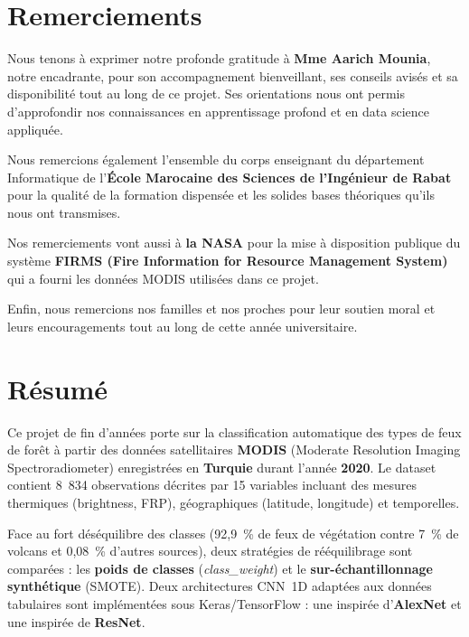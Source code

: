 \documentclass[12pt,a4paper]{report}
\begin{document}
\chapter*{Remerciements}
\thispagestyle{fancy}

\justifying
Nous tenons \`{a} exprimer notre profonde gratitude \`{a} \textbf{Mme Aarich Mounia}, notre encadrante, pour son accompagnement bienveillant, ses conseils avis\'{e}s et sa disponibilit\'{e} tout au long de ce projet. Ses orientations nous ont permis d'approfondir nos connaissances en apprentissage profond et en data science appliqu\'{e}e.

Nous remercions \'{e}galement l'ensemble du corps enseignant du d\'{e}partement Informatique de l'\textbf{\'{E}cole Marocaine des Sciences de l'Ing\'{e}nieur de Rabat} pour la qualit\'{e} de la formation dispens\'{e}e et les solides bases th\'{e}oriques qu'ils nous ont transmises.

Nos remerciements vont aussi \`{a} \textbf{la NASA} pour la mise \`{a} disposition publique du syst\`{e}me \textbf{FIRMS (Fire Information for Resource Management System)} qui a fourni les donn\'{e}es MODIS utilis\'{e}es dans ce projet.

Enfin, nous remercions nos familles et nos proches pour leur soutien moral et leurs encouragements tout au long de cette ann\'{e}e universitaire.

\chapter*{R\'{e}sum\'{e}}

\justifying
Ce projet de fin d'ann\'{e}es porte sur la classification automatique des types de feux de for\^{e}t \`{a} partir des donn\'{e}es satellitaires \textbf{MODIS} (Moderate Resolution Imaging Spectroradiometer) enregistr\'{e}es en \textbf{Turquie} durant l'ann\'{e}e \textbf{2020}. Le dataset contient 8~834 observations d\'{e}crites par 15 variables incluant des mesures thermiques (brightness, FRP), g\'{e}ographiques (latitude, longitude) et temporelles.

Face au fort d\'{e}s\'{e}quilibre des classes (92,9~\% de feux de v\'{e}g\'{e}tation contre 7~\% de volcans et 0,08~\% d'autres sources), deux strat\'{e}gies de r\'{e}\'{e}quilibrage sont compar\'{e}es : les \textbf{poids de classes} (\textit{class\_weight}) et le \textbf{sur-\'{e}chantillonnage synth\'{e}tique} (SMOTE). Deux architectures CNN~1D adapt\'{e}es aux donn\'{e}es tabulaires sont impl\'{e}ment\'{e}es sous Keras/TensorFlow : une inspir\'{e}e d'\textbf{AlexNet} et une inspir\'{e}e de \textbf{ResNet}.
\end{document}
